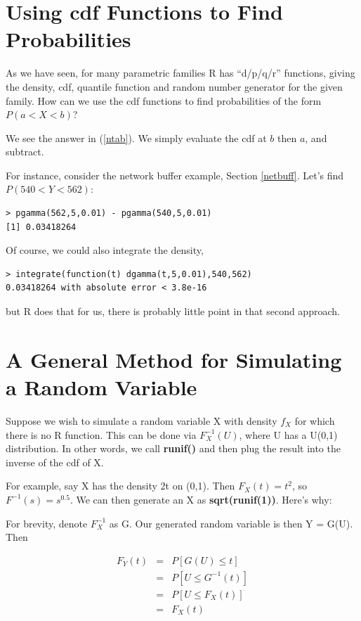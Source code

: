 \section{Using cdf Functions to Find Probabilities}

As we have seen, for many parametric families R has ``d/p/q/r''
functions, giving the density, cdf, quantile function and random number
generator for the given family.  How can we use the cdf functions to
find probabilities of the form $P(a < X < b)$?

We see the answer in (\ref{ntab}).  We simply evaluate the cdf at $b$
then $a$, and subtract.

For instance, consider the network buffer example, Section
\ref{netbuff}.  Let's find $P(540 < Y < 562)$:

\begin{lstlisting}
> pgamma(562,5,0.01) - pgamma(540,5,0.01)
[1] 0.03418264
\end{lstlisting}

Of course, we could also integrate the density,

\begin{lstlisting}
> integrate(function(t) dgamma(t,5,0.01),540,562)
0.03418264 with absolute error < 3.8e-16
\end{lstlisting}

but R does that for us, there is probably little point in that second
approach.

\section{A General Method for Simulating a Random Variable}
\label{genrannumgen}

Suppose we wish to simulate a random variable X with density $f_{X}$ for
which there is no R function. This can be done via $F_X^{-1}(U)$, where
U has a U(0,1) distribution.  In other words, we call {\bf runif()} and
then plug the result into the inverse of the cdf of X. 

For example, say X has the density 2t on (0,1). Then $F_X(t) = t^2$, so
$F^{-1}(s) = s^{0.5}$.  We can then generate an X as {\bf
sqrt(runif(1))}.  Here's why:

For brevity, denote $F_X^{-1}$ as G.  Our generated random variable is
then Y = G(U).  Then

\begin{eqnarray}
F_Y(t) &=& P[G(U)\leq t] \\
& = & P[U\leq G^{-1}(t)] \\
& = & P[U\leq F_X(t)] \\
& = & F_X(t)
\end{eqnarray}

